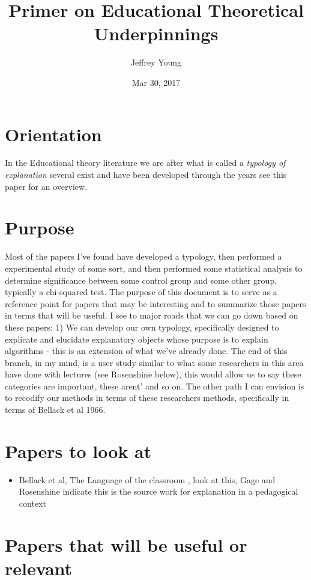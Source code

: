 \documentclass[10pt, letterpaper]{article}
\author{Jeffrey Young}
\date{Mar 30, 2017}
\title{Primer on Educational Theoretical Underpinnings}
\begin{document}
\maketitle


\section*{Orientation}
\label{sec:org537e346}
In the Educational theory literature we are after what is called a \emph{typology of explanation} several exist and have been developed through the years see this paper \cite{brown1984explaining} for an overview.

\section*{Purpose}
\label{sec:org564d1bf}
Most of the papers I've found have developed a typology, then performed a experimental study of some sort, and then performed some statistical analysis to determine significance between some control group and some other group, typically a chi-squared test. The purpose of this document is to serve as a reference point for papers that may be interesting and to summarize those papers in terms that will be useful. I see to major roads that we can go down based on these papers: 1) We can develop our own typology, specifically designed to explicate and elucidate explanatory objects whose purpose is to explain algorithms - this is an extension of what we've already done. The end of this branch, in my mind, is a user study similar to what some researchers in this area have done with lectures (see Rosenshine below), this would allow us to say these categories are important, these arent' and so on. The other path I can envision is to recodify our methods in terms of these researchers methods, specifically in terms of Bellack et al 1966.

\section*{Papers to look at}
\label{sec:org5c22cc4}
\begin{itemize}
\item Bellack et al, The Language of the classroom \cite{bellack1966language}, look at this, Gage and Rosenshine indicate this is the source work for explanation in a pedagogical context
\end{itemize}

\section*{Papers that will be useful or relevant}
\label{sec:org03415b2}
\end{document}
